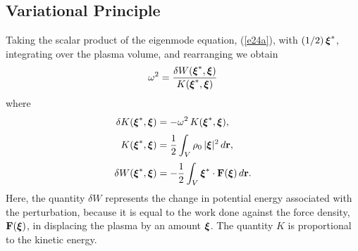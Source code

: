 \documentclass[12pt,prb,aps,notitlepage]{revtex4-1}
\newcommand{\bxi}{\mbox{\boldmath$\xi$}}
\begin{document}
\subsection{Variational Principle}
Taking the scalar product of the eigenmode equation, (\ref{e24a}), with $(1/2)\,\bxi^\ast$, integrating over the
plasma volume, and rearranging  we obtain
\begin{equation}\label{e101}
\omega^2 = \frac{\delta W(\bxi^\ast,\bxi)}{K(\bxi^\ast,\bxi)}
\end{equation}
where
\begin{align}
\delta K(\bxi^\ast,\bxi) &= -\omega^2\,K(\bxi^\ast,\bxi),\\[0.5ex]
K(\bxi^\ast,\bxi) &= \frac{1}{2}\int_V\rho_0\,|\bxi|^2\,d{\bf r},\label{e99}\\[0.5ex]
\delta W(\bxi^\ast,\bxi) &= -\frac{1}{2}\int_V \bxi^\ast\cdot {\bf F}(\bxi)\,d{\bf r}.\label{e100}
\end{align}
Here, the quantity $\delta W$ represents the change in potential energy associated with the perturbation, because it is equal to the work
done against the force density, ${\bf F}(\bxi)$, in displacing the plasma by an amount $\bxi$. The quantity $K$ is
proportional to the kinetic energy. 
\end{document}
